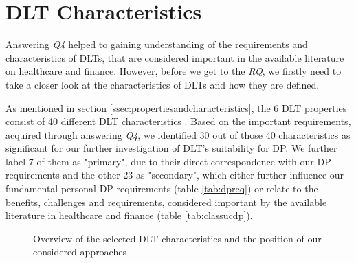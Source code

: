 \section{DLT Characteristics}
\label{sec:dltcharacteristics}

Answering \textit{Q4} helped to gaining understanding of the requirements and characteristics of DLTs, that are considered important in the available literature on healthcare and finance. However, before we get to the \textit{RQ}, we firstly need to take a closer look at the characteristics of DLTs and how they are defined. \newline 

As mentioned in section \ref{ssec:propertiesandcharacteristics}, the 6 DLT properties consist of 40 different DLT characteristics \cite{dlt_4}. Based on the important requirements, acquired through answering \textit{Q4}, we identified 30 out of those 40 characteristics as significant for our further investigation of DLT's suitability for DP. We further label 7 of them as "primary", due to their direct correspondence with our DP requirements and the other 23 as "secondary", which either further influence our fundamental personal DP requirements (table \ref{tab:dpreq}) or relate to the benefits, challenges and requirements, considered important by the available literature in healthcare and finance (table \ref{tab:classucdp}). \newline


\begin{figure}[H]
    \centering
     
    \caption{Overview of the selected DLT characteristics and the position of our considered approaches}
    \label{fig:dlt}
\end{figure}

